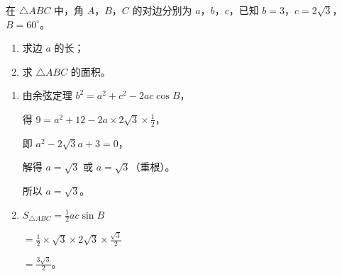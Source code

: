\documentclass{exam-zh}
\begin{document}
\begin{problem}[points = 12]
  在 $\triangle ABC$ 中，角 $A$，$B$，$C$ 的对边分别为 $a$，$b$，$c$，已知 $b = 3$，$c = 2\sqrt{3}$，$B = 60^\circ$。

  \begin{enumerate}
    \item 求边 $a$ 的长；
    \item 求 $\triangle ABC$ 的面积。
  \end{enumerate}

  \begin{solution}
    \begin{enumerate}
      \item 由余弦定理 $b^2 = a^2 + c^2 - 2ac\cos B$，

      得 $9 = a^2 + 12 - 2a \times 2\sqrt{3} \times \frac{1}{2}$，

      即 $a^2 - 2\sqrt{3}a + 3 = 0$，

      解得 $a = \sqrt{3}$ 或 $a = \sqrt{3}$（重根）。

      所以 $a = \sqrt{3}$。

      \item $S_{\triangle ABC} = \frac{1}{2}ac\sin B$ 

      $= \frac{1}{2} \times \sqrt{3} \times 2\sqrt{3} \times \frac{\sqrt{3}}{2}$ 

      $= \frac{3\sqrt{3}}{2}$。
    \end{enumerate}
  \end{solution}
\end{problem}
\end{document}
